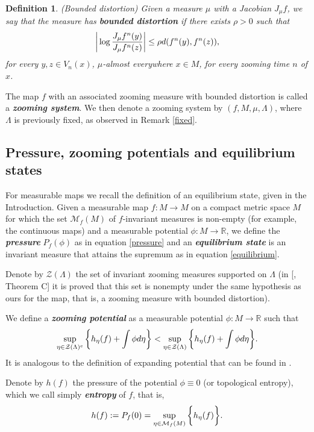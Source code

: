 \documentclass[12pt,a4paper]{amsart}
\theoremstyle{plain}
\newtheorem{definition}{Definition}[subsection]
\begin{document}
\begin{definition}
	(Bounded distortion) Given a measure $\mu$ with a Jacobian $J_{\mu}f$, we say that the measure has \textbf{\textit{bounded distortion}} if there exists $\rho > 0$ such that
	\[
	\bigg{|}\log \frac{J_{\mu}f^{n}(y)}{J_{\mu}f^{n}(z)} \bigg{|} \leq \rho d(f^{n}(y),f^{n}(z)),
	\]
	for every $y,z \in V_{n}(x)$, $\mu$-almost everywhere $x \in M$, for every zooming time $n$ of $x$.
\end{definition}

The map $f$ with an associated zooming measure with bounded distortion is called a \textbf{\textit{zooming system}}. We then denote a zooming system by $(f,M,\mu,\Lambda)$, where $\Lambda$ is previously fixed, as observed in Remark \ref{fixed}.

\subsection{Pressure, zooming potentials and equilibrium states} For measurable maps we recall the definition of an equilibrium state, given in the Introduction. Given a measurable map $f: M \to M$ on a compact metric space $M$ for which the set $\mathcal{M}_{f}(M)$ of $f$-invariant measures is non-empty (for example, the continuous maps) and a measurable potential $\phi : M \to \mathbb{R}$, we define the \textbf{\textit{pressure}} $P_{f}(\phi)$ as in equation \ref{pressure} and an  \textbf{\textit{equilibrium state}} is an invariant measure that attains the supremum as in equation \ref{equilibrium}.

Denote by $\mathcal{Z}(\Lambda)$ the set of invariant zooming measures supported on $\Lambda$ (in [\cite{Pi1}, Theorem C] it is proved that this set is nonempty under the same hypothesis as ours for the map, that is, a zooming measure with bounded distortion). 

We define a \textbf{\textit{zooming potential}} as a measurable potential $\phi:M \to \mathbb{R}$ such that
\[
\displaystyle  \sup_{\eta \in \mathcal{Z}(\Lambda)^{c}} \bigg{\{} h_{\eta}(f) + \int \phi d\eta \bigg{\}} < \sup_{\eta \in \mathcal{Z}(\Lambda)} \bigg{\{} h_{\eta}(f) + \int \phi d\eta \bigg{\}}.
\]
It is analogous to the definition of expanding potential that can be found in \cite{PV}.

Denote by $h(f)$ the pressure of the potential $\phi \equiv 0$ (or topological entropy), which we call simply \textbf{\textit{entropy}} of $f$, that is,
\[
\displaystyle h(f) := P_{f}(0)  = \sup_{\eta \in \mathcal{M}_{f}(M)} \bigg{\{} h_{\eta}(f) \bigg{\}}.
\]
\end{document}
